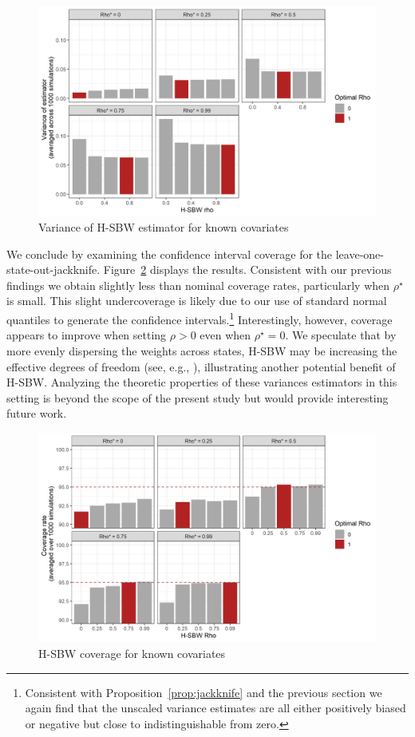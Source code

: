 \begin{figure}[H]
\begin{center}
    \caption{Variance of H-SBW estimator for known covariates}\label{fig:hsbwvarx}
    \includegraphics[scale=0.5]{01_Plots/variance-x-plot.png}
\end{center}
\end{figure}

We conclude by examining the confidence interval coverage for the leave-one-state-out-jackknife. Figure~\ref{fig:hsbwcoveragex} displays the results. Consistent with our previous findings we obtain slightly less than nominal coverage rates, particularly when $\rho^\star$ is small. This slight undercoverage is likely due to our use of standard normal quantiles to generate the confidence intervals.\footnote{Consistent with Proposition~\ref{prop:jackknife} and the previous section we again find that the unscaled variance estimates are all either positively biased or negative but close to indistinguishable from zero.} Interestingly, however, coverage appears to improve when setting $\rho > 0$ even when $\rho^\star = 0$. We speculate that by more evenly dispersing the weights across states, H-SBW may be increasing the effective degrees of freedom (see, e.g., \cite{cameron2015practitioner}), illustrating another potential benefit of H-SBW. Analyzing the theoretic properties of these variances estimators in this setting is beyond the scope of the present study but would provide interesting future work.

\begin{figure}[H]
\begin{center}
    \caption{H-SBW coverage for known covariates}\label{fig:hsbwcoveragex}
    \includegraphics[scale=0.5]{01_Plots/coverage-x-plot.png}
\end{center}
\end{figure}

